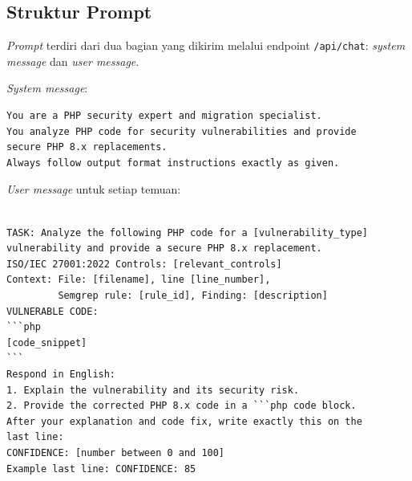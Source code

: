 \subsection{Struktur Prompt}

\textit{Prompt} terdiri dari dua bagian yang dikirim melalui endpoint \texttt{/api/chat}: \textit{system message} dan \textit{user message}. 

\textit{System message}:

\begin{lstlisting}[style=promptstyle]
You are a PHP security expert and migration specialist. 
You analyze PHP code for security vulnerabilities and provide 
secure PHP 8.x replacements. 
Always follow output format instructions exactly as given.
\end{lstlisting}
\newpage
\textit{User message} untuk setiap temuan:

\begin{lstlisting}[style=promptstyle]

TASK: Analyze the following PHP code for a [vulnerability_type]
vulnerability and provide a secure PHP 8.x replacement.
ISO/IEC 27001:2022 Controls: [relevant_controls]
Context: File: [filename], line [line_number],
         Semgrep rule: [rule_id], Finding: [description]
VULNERABLE CODE:
```php
[code_snippet]
```
Respond in English:
1. Explain the vulnerability and its security risk.
2. Provide the corrected PHP 8.x code in a ```php code block.
After your explanation and code fix, write exactly this on the
last line:
CONFIDENCE: [number between 0 and 100]
Example last line: CONFIDENCE: 85
\end{lstlisting}

